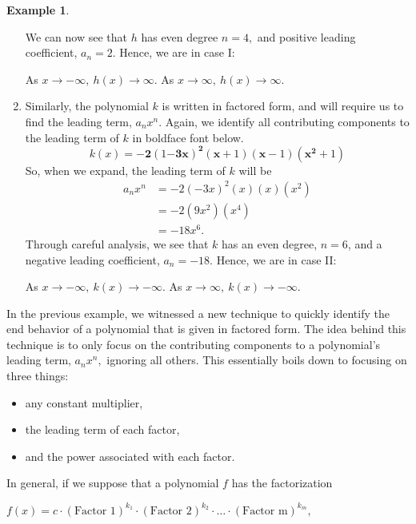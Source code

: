 \documentclass[12pt]{book}
\theoremstyle{definition}
\newtheorem{example}{Example}
\begin{document}
\begin{example}
\begin{enumerate}
We can now see that $h$ has even degree $n=4,$ and positive leading coefficient, $a_n=2$.  Hence, we are in case I:
\begin{center}
As $x\rightarrow -\infty, \ h(x)\rightarrow \infty.$ \hspace{1in} As $x\rightarrow \infty, \ h(x)\rightarrow \infty.$
\end{center}
\item Similarly, the polynomial $k$ is written in factored form, and will require us to find the leading term, $a_nx^n$.  Again, we identify all contributing components to the leading term of $k$ in boldface font below. 
$$k(x)=\mathbf{-2}(1\mathbf{-3x})^{\mathbf{2}}(\mathbf{x}+1)(\mathbf{x}-1)(\mathbf{x^2}+1)$$
So, when we expand, the leading term of $k$ will be
\begin{equation*}
\begin{split}
a_nx^n & =-2(-3x)^2(x)(x)(x^2)\\
& = -2(9x^2)(x^4)\\
& = -18x^6.
\end{split}
\end{equation*}
Through careful analysis, we see that $k$ has an even degree, $n=6$, and a negative leading coefficient, $a_n=-18$.  Hence, we are in case II:
\begin{center}
As $x\rightarrow -\infty, \ k(x)\rightarrow -\infty.$ \hspace{1in} As $x\rightarrow \infty, \ k(x)\rightarrow -\infty.$
\end{center}
\end{enumerate}
\end{example}
In the previous example, we witnessed a new technique to quickly identify the end behavior of a polynomial that is given in factored form. 
The idea behind this technique is to only focus on the contributing components to a polynomial's leading term, $a_nx^n,$ ignoring all others.  This essentially boils down to focusing on three things:
 \begin{itemize}
		\item any constant multiplier,
		\item the leading term of each factor,
		\item and the power associated with each factor.
	\end{itemize}
In general, if we suppose that a polynomial $f$ has the factorization
\begin{center}
$f(x)=c\cdot(\text{Factor 1})^{k_1}\cdot(\text{Factor 2})^{k_2}\cdot\ldots\cdot(\text{Factor m})^{k_m},$
\end{center}
\end{document}
